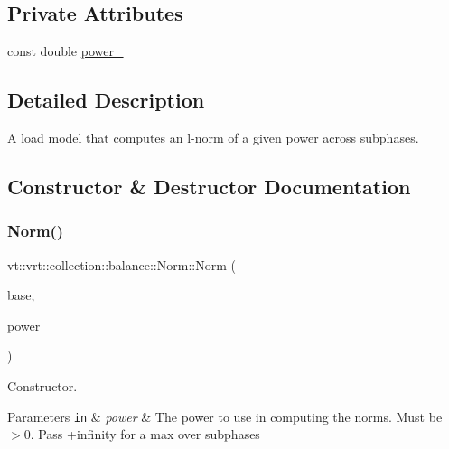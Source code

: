 \subsection*{Private Attributes}
\begin{DoxyCompactItemize}
\item 
const double \hyperlink{classvt_1_1vrt_1_1collection_1_1balance_1_1_norm_a03090310a3420b16ee581541cb261661}{power\+\_\+}
\end{DoxyCompactItemize}


\subsection{Detailed Description}
A load model that computes an l-\/norm of a given power across subphases. 

\subsection{Constructor \& Destructor Documentation}
\mbox{\label{classvt_1_1vrt_1_1collection_1_1balance_1_1_norm_a054625ebe2a8dcd9f986f36f40b70ada}} 
\subsubsection{\texorpdfstring{Norm()}{Norm()}}
{\footnotesize\ttfamily vt\+::vrt\+::collection\+::balance\+::\+Norm\+::\+Norm (\begin{DoxyParamCaption}\item[{std\+::shared\+\_\+ptr$<$ \hyperlink{classvt_1_1vrt_1_1collection_1_1balance_1_1_load_model}{balance\+::\+Load\+Model} $>$}]{base,  }\item[{double}]{power }\end{DoxyParamCaption})}



Constructor. 


\begin{DoxyParams}[1]{Parameters}
\mbox{\tt in}  & {\em power} & The power to use in computing the norms. Must be $>$0. Pass +infinity for a {\ttfamily max} over subphases \\
\hline
\end{DoxyParams}


